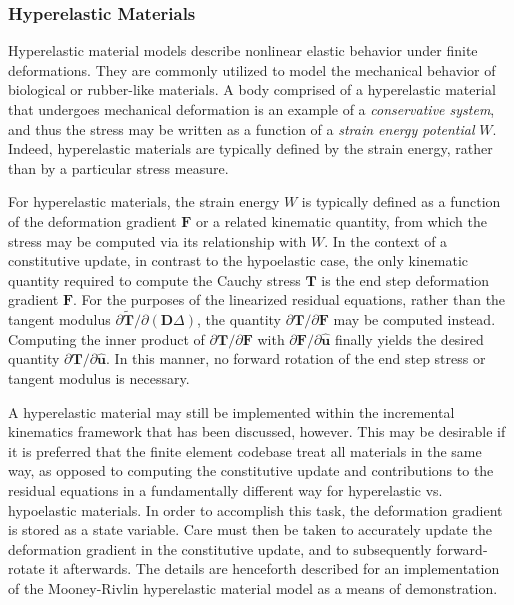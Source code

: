 \subsubsection{Hyperelastic Materials}

Hyperelastic material models describe nonlinear elastic behavior under finite deformations. They are commonly utilized to model the mechanical behavior of biological or rubber-like materials. A body comprised of a hyperelastic material that undergoes mechanical deformation is an example of a  \textit{conservative system}, and thus the stress may be written as a function of a \textit{strain energy potential} $W$. Indeed, hyperelastic materials are typically defined by the strain energy, rather than by a particular stress measure.

For hyperelastic materials, the strain energy $W$ is typically defined as a function of the deformation gradient $\bm{F}$ or a related kinematic quantity, from which the stress may be computed via its relationship with $W$. In the context of a constitutive update, in contrast to the hypoelastic case, the only kinematic quantity required to compute the Cauchy stress $\bm{T}$ is the end step deformation gradient $\bm{F}$. For the purposes of the linearized residual equations, rather than the tangent modulus ${\partial \tilde{\bm{T}}}/{\partial (\bm{D}\Delta)}$, the quantity ${\partial \bm{T}}/{\partial \bm{F}}$ may be computed instead. Computing the inner product of ${\partial \bm{T}}/{\partial \bm{F}}$ with $\partial \bm{F}/\partial \hat{\bm{u}}$ finally yields the desired quantity $\partial \bm{T}/\partial \hat{\bm{u}}$. In this manner, no forward rotation of the end step stress or tangent modulus is necessary.

A hyperelastic material may still be implemented within the incremental kinematics framework that has been discussed, however. This may be desirable if it is preferred that the finite element codebase treat all materials in the same way, as opposed to computing the constitutive update and contributions to the residual equations in a fundamentally different way for hyperelastic vs. hypoelastic materials. In order to accomplish this task, the deformation gradient is stored as a state variable. Care must then be taken to accurately update the deformation gradient in the constitutive update, and to subsequently forward-rotate it afterwards. The details are henceforth described for an implementation of the Mooney-Rivlin hyperelastic material model as a means of demonstration.

